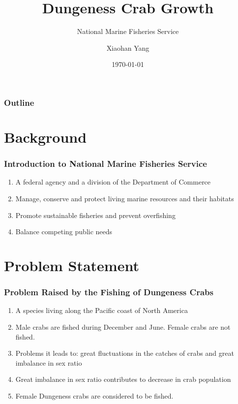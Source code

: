\documentclass[compress,handout,10pt]{beamer}
\title{{\color{blue} \LARGE Dungeness Crab Growth\newline} }
\subtitle{{\color{red} \large National Marine Fisheries Service} }
\author{ 
    {Xiaohan Yang} \\ 
    \vspace{5pt}
}
\institute{Johns Hopkins University}
\date{\mygreen \today}
\let\olditem\item
\renewcommand{\item}{\setlength{\itemsep}{0.5\baselineskip}\olditem}
\begin{document}
\begin{frame}[plain]
    \titlepage
\end{frame}

\begin{frame}
    \frametitle{Outline}
    \tableofcontents
\end{frame}

\section{Background}

\begin{frame}
    \frametitle{Introduction to National Marine Fisheries Service}
    \vspace{7pt}
             \begin{enumerate}
                 \item A federal agency and a division of the Department of Commerce
                 \item Manage, conserve and protect living marine resources and their habitats
                 \item Promote sustainable fisheries and prevent overfishing
                 \item Balance competing public needs
             \end{enumerate}
\end{frame}

\section{Problem Statement}
\begin{frame}
    \frametitle{Problem Raised by the Fishing of Dungeness Crabs}
     \begin{enumerate}
         \item A species living along the Pacific coast of North America
         \item Male crabs are fished during December and June. Female crabs are not fished.
         \item Problems it leads to: great fluctuations in the catches of crabs and great imbalance in sex ratio
         \item Great imbalance in sex ratio contributes to decrease in crab population
         \item Female Dungeness crabs are considered to be fished.
     \end{enumerate}
\end{frame}
\end{document}
